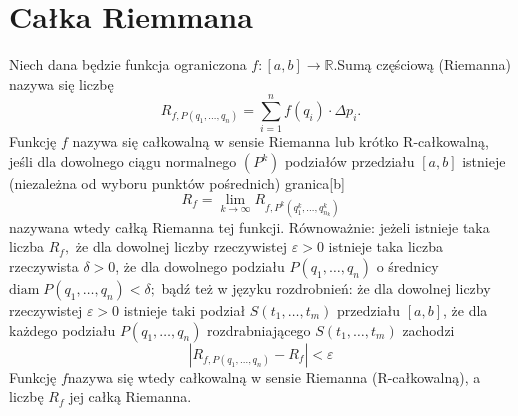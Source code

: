 \documentclass[a4paper,11pt,fleqn]{article}
\begin{document}
\section*{Całka Riemmana}
 Niech dana będzie funkcja ograniczona 
 $f\!\colon\![a,b]\to \mathbb {R} $.Sumą częściową (Riemanna) nazywa się liczbę
   \[R_{f,P(q_{1},\dots ,q_{n})}=\sum _{i=1}^{n}f(q_{i})\cdot \Delta p_{i}.\] %
Funkcję \(f\) nazywa się całkowalną w sensie Riemanna lub krótko R-całkowalną, jeśli dla dowolnego ciągu normalnego $(P^{k})$ podziałów przedziału $[ a , b ]$
istnieje (niezależna od wyboru punktów pośrednich) granica[b]
%
  \[ R_{f}=\lim _{k\to \infty }R_{f,P^{k}\left(q_{1}^{k},\dots ,q_{n_{k}}^{k}\right)}\]
%
nazywana wtedy całką Riemanna tej funkcji. Równoważnie: jeżeli istnieje taka liczba  ${\displaystyle R_{f},}$ że dla dowolnej liczby rzeczywistej $\varepsilon >0$ 
istnieje taka liczba rzeczywista $\delta >0$, że dla dowolnego podziału $P(q_{1},\dots ,q_{n})$ o średnicy ${\displaystyle \mathrm {diam} \;P(q_{1},\dots ,q_{n})<\delta ;}$ bądź też w języku rozdrobnień: że dla dowolnej liczby rzeczywistej $\varepsilon >0$ istnieje taki podział $S(t_{1},\dots ,t_{m})$ przedziału $[a,b]$, że dla każdego podziału
$P(q_{1},\dots ,q_{n})$  rozdrabniającego $S(t_{1},\dots ,t_{m})$ zachodzi
%
    \[\left|R_{f,P(q_{1},\dots ,q_{n})}-R_{f}\right|<\varepsilon \]
% 
Funkcję $f$nazywa się wtedy całkowalną w sensie Riemanna (R-całkowalną), a liczbę $R_f$ jej całką Riemanna.
\end{document}
